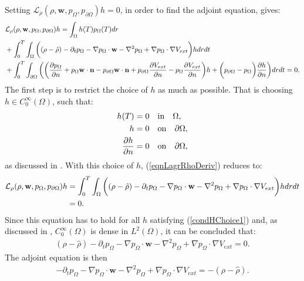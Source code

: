 Setting $\mathcal{L}_\rho (\rho,\mathbf{w}, p_\Omega, p_{\partial \Omega}) h =0$, in order to find the adjoint equation, gives:
\begin{align} \label{eqnLagrRhoDeriv}
&\mathcal{L}_\rho (\rho,\mathbf{w}, p_\Omega, p_{\partial \Omega}) h =\int_\Omega h(T) p_\Omega(T) dr\\
&+ \int_0^T \int_\Omega \bigg( (\rho- \hat{\rho})   - \partial_t  p_\Omega  - \nabla p_\Omega \cdot \mathbf{w}  - \nabla^2 p_\Omega \notag 
  +  \nabla p_\Omega\cdot \nabla V_{ext} \bigg)h dr dt  \notag \\
& +  \int_0^T\int_{\partial \Omega}  \bigg(
\bigg(\frac{\partial p_\Omega }{\partial n} + p_\Omega  \mathbf{w} \cdot \mathbf{n} - p_{\partial \Omega} \mathbf{w} \cdot \mathbf{n} +  p_{\partial \Omega} \dfrac{\partial V_{ext}}{\partial n} - p_\Omega \frac{\partial V_{ext}}{\partial n} \bigg)h \notag+ \bigg( p_{\partial \Omega}- p_\Omega \bigg) \frac{\partial h}{\partial n} \bigg) dr dt =0. \notag
\end{align}
The first step is to restrict the choice of $h$ as much as possible. That is choosing $h \in C_0^\infty(\Omega)$, such that: 
\begin{align}\label{condHChoice1}
h(T)&=0 \quad \text{in} \quad \Omega, \\
h&=0 \quad \text{on} \quad \partial \Omega, \notag \\
\frac{\partial h}{\partial n}&=0 \quad \text{on} \quad \partial \Omega, \notag
\end{align}
as discussed in \cite{TroeltzschFredi2010OCoP}.
With this choice of $h$, (\ref{eqnLagrRhoDeriv}) reduces to:
\begin{align}\label{eqnOptiAdjRho1}
\mathcal{L}_\rho (\rho,\mathbf{w}, p_\Omega, p_{\partial \Omega}) h 
 &= \int_0^T \int_\Omega  \bigg( (\rho- \hat{\rho})   - \partial_t  p_\Omega  - \nabla p_\Omega \cdot \mathbf{w}  - \nabla^2 p_\Omega 
 +  \nabla p_\Omega\cdot \nabla V_{ext} \bigg)h dr dt  \notag \\
&=0.
\end{align}
Since this equation has to hold for all $h$ satisfying (\ref{condHChoice1}) and, as discussed in \cite{TroeltzschFredi2010OCoP}, $C_0^\infty(\Omega)$ is dense in $L^2(\Omega)$, it can be concluded that:
\begin{align*}
(\rho- \hat{\rho})   - \partial_t  p_\Omega  - \nabla p_\Omega \cdot \mathbf{w}  - \nabla^2 p_\Omega 
  +  \nabla p_\Omega\cdot \nabla V_{ext} =0.
\end{align*}
The adjoint equation is then
\begin{align*}
 - \partial_t  p_\Omega  - \nabla p_\Omega \cdot \mathbf{w}  - \nabla^2 p_\Omega 
+  \nabla p_\Omega\cdot \nabla V_{ext} =-(\rho- \hat{\rho}) . 
\end{align*}
